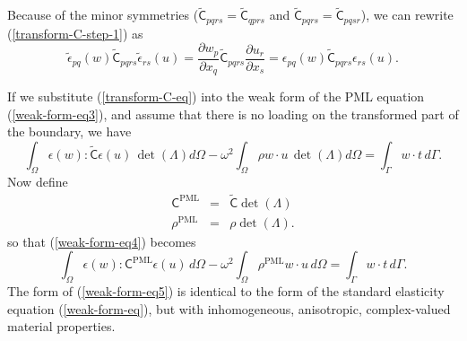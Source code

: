 \documentclass{article}
\newcommand{\sfC}{\mathsf{C}}
\begin{document}
Because of the minor symmetries 
($\tilde{\sfC}_{pqrs} = \tilde{\sfC}_{qprs}$ and
 $\tilde{\sfC}_{pqrs} = \tilde{\sfC}_{pqsr}$),
we can rewrite (\ref{transform-C-step-1}) as
\begin{equation}
    \tilde{\epsilon}_{pq}(w)
    \tilde{\sfC}_{pqrs}
    \tilde{\epsilon}_{rs}(u)
  =
    \frac{\partial w_p}{\partial x_q}
    \tilde{\sfC}_{pqrs}
    \frac{\partial u_r}{\partial x_s} 
  =
    \epsilon_{pq}(w)
    \tilde{\sfC}_{pqrs}
    \epsilon_{rs}(u).
  \label{transform-C-eq}
\end{equation}

If we substitute (\ref{transform-C-eq}) into the weak form of the
PML equation (\ref{weak-form-eq3}), and assume that there is no
loading on the transformed part of the boundary, we have
\begin{equation}
  \int_{\Omega} 
    \epsilon(w) : \tilde{\sfC} \epsilon(u) \, \det(\Lambda) d\Omega -
  \omega^2 \int_\Omega \rho w \cdot u \, \det(\Lambda) d\Omega =
  \int_{\Gamma}
    w \cdot t \, d\Gamma.
  \label{weak-form-eq4}
\end{equation}
Now define
\begin{eqnarray}
  \sfC^{\mathrm{PML}} & = & \tilde{\sfC} \det(\Lambda) \\
  \rho^{\mathrm{PML}} & = & \rho \det(\Lambda).
\end{eqnarray}
so that (\ref{weak-form-eq4}) becomes
\begin{equation}
  \int_{\Omega} 
    \epsilon(w) : \sfC^{\mathrm{PML}} \epsilon(u) \, d\Omega -
  \omega^2 \int_\Omega \rho^{\mathrm{PML}} w \cdot u \, d\Omega =
  \int_{\Gamma}
    w \cdot t \, d\Gamma.
  \label{weak-form-eq5}
\end{equation}
The form of (\ref{weak-form-eq5}) is identical to the form of the
standard elasticity equation (\ref{weak-form-eq}), but with
inhomogeneous, anisotropic, complex-valued material properties.

\end{document}
